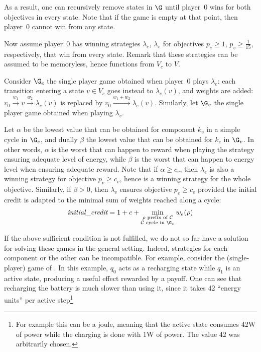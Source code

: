 As a result, one can recursively remove states in $\G$ until player~0 wins for both objectives in every state.
Note that if the game is empty at that point, then player~0 cannot win from any state.

Now assume player~0 has winning strategies $\lambda_e$, $\lambda_v$ for objectives $p_e \geq 1$, $p_v \geq \frac1{15}$, respectively, that win from every state.
Remark that these strategies can be assumed to be memoryless, hence functions from $V_c$ to $V$.

Consider $\G_e$ the single player game obtained when player~0 plays $\lambda_e$: each transition entering a state $v \in V_c$ goes instead to $\lambda_e(v)$, and weights are added: $v_0 \xrightarrow{w_1} v \xrightarrow{w_2} \lambda_e(v)$ is replaced by $v_0 \xrightarrow{w_1+w_2} \lambda_e(v)$.
Similarly, let $\G_v$ the single player game obtained when playing $\lambda_v$.

Let $\alpha$ be the lowest value that can be obtained for component $k_v$ in a simple cycle in $\G_e$, and dually $\beta$ the lowest value that can be obtained for $k_e$ in $\G_v$.
In other words, $\alpha$ is the worst that can happen to reward when playing the strategy ensuring adequate level of energy, while $\beta$ is the worst that can happen to energy level when ensuring adequate reward.
Note that if $\alpha \geq c_v$, then $\lambda_e$ is also a winning strategy for objective $p_v \geq c_v$, hence is a winning strategy for the whole objective.
Similarly, if $\beta > 0$, then $\lambda_v$ ensures objective $p_e \geq c_e$ provided the initial credit is adapted to the minimal sum of weights reached along a cycle:
\[\textit{initial\_credit} = 1+c+\min_{\substack{\rho \textrm{ prefix of } \mathcal{C}\\  \mathcal{C}\textrm{ cycle in } \G_v}} w_e(\rho)\]

\medskip

If the above sufficient condition is not fulfilled, we do not so far have a solution for solving these games in the general setting.
Indeed, strategies for each component or the other can be incompatible.
For example, consider the (single-player) game of .
In this example, $q_0$ acts as a recharging state while $q_1$ is an active state, producing a useful effect rewarded by a payoff.
One can see that recharging the battery is much slower than using it, since it takes 42 ``energy units'' per active step\footnote{For example this can be a joule, meaning that the active state consumes 42W of power while the charging is done with 1W of power. The value 42 was arbitrarily chosen.}

